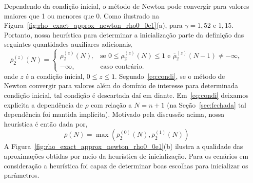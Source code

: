         Dependendo da condição inicial, o método de Newton pode  convergir para valores maiores que 1 ou menores que 0. Como ilustrado na Figura~\ref{fig:rho_exact_approx_newton_rho0_0e1}(a),  para $\gamma=1,52$ e $1,15$. Portanto, nossa  heurística para determinar  a  inicialização parte da definição das seguintes quantidades auxiliares adicionais,
        \begin{equation}
    	    \bar{\rho}_2^{(z)}(N) = \left\{
            \begin{array}{ll}
                {\rho}_2^{(z)}(N), & \textrm{se } 0 \leq {\rho}_2^{(z)}(N) \leq 1 \textrm{ e } \bar{\rho}_2^{(z)}(N-1) \neq -\infty, \\
    	        -\infty, & \textrm{caso contrário.}
            \end{array}\right. \label{eq:condi}
    	\end{equation}
	    onde $z$ é a condição inicial, $0 \leq z \leq 1$.
	    Segundo~\eqref{eq:condi}, se o método de Newton convergir para valores além do domínio de interesse para determinada condição inicial, tal condição é descartada daí em diante.  Em~\eqref{eq:condi} deixamos explícita a dependência de $\rho$ com relação a $N=n+1$ (na Seção~\ref{sec:fechada} tal dependência foi mantida implícita). Motivado pela discussão acima, nossa heurística é então dada por,
    	\begin{equation} \label{eq:heuri}
    	    \bar{\rho}(N) = \max(\bar{\rho}_2^{(0)}(N), \bar{\rho}_2^{(1)}(N))
    	\end{equation}
	    A Figura~\ref{fig:rho_exact_approx_newton_rho0_0e1}(b) ilustra a qualidade das aproximações obtidas por meio da heurística de inicialização. Para os cenários em consideração a heurística foi capaz de determinar boas escolhas para inicializar os parâmetros. 


